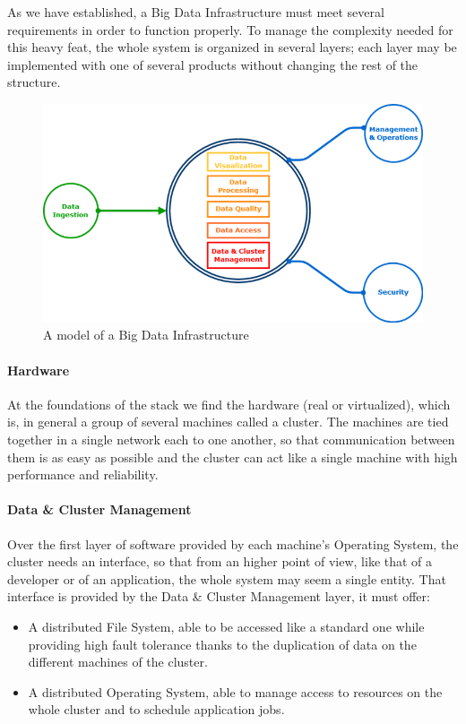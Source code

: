 As we have established, a Big Data Infrastructure must meet several requirements in order to function properly. 
To manage the complexity needed for this heavy feat, the whole system is organized in several layers; each layer may be implemented with one of several products without changing the rest of the structure.

\begin{figure}
	\centering
	\includegraphics[scale=0.8]{Figures/stack_infrastructure.png}
	\decoRule
	\caption[Infrastructural Stack]{A model of a Big Data Infrastructure}
	\label{fig:InfrastructuralStack}
\end{figure}

\paragraph{Hardware}

At the foundations of the stack we find the hardware (real or virtualized), which is, in general a group of several machines called a cluster.\newline
The machines are tied together in a single network each to one another, so that communication between them is as easy as possible and the cluster can act like a single machine with high performance and reliability.

\paragraph{Data \& Cluster Management}

Over the first layer of software provided by each machine's Operating System, the cluster needs an interface, so that from an higher point of view, like that of a developer or of an application, the whole system may seem a single entity. \newline
That interface is provided by the Data \& Cluster Management layer, it must offer: 
\begin{itemize}
	\item A distributed File System, able to be accessed like a standard one while providing high fault tolerance thanks to the duplication of data on the different machines of the cluster.
	\item A distributed Operating System, able to manage access to resources on the whole cluster and to schedule application jobs.
\end{itemize}

